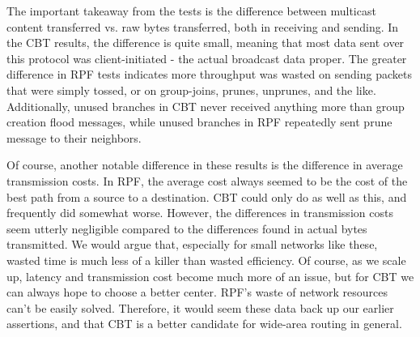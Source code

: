 \documentclass[11pt]{article}
\begin{document}
    The important takeaway from the tests is the difference between multicast content transferred vs. raw bytes transferred, both in receiving and sending. In the CBT results, the difference is quite small, meaning that most data sent over this protocol was client-initiated - the actual broadcast data proper. The greater difference in RPF tests indicates more throughput was wasted on sending packets that were simply tossed, or on group-joins, prunes, unprunes, and the like. Additionally, unused branches in CBT never received anything more than group creation flood messages, while unused branches in RPF repeatedly sent prune message to their neighbors.
    
    Of course, another notable difference in these results is the difference in average transmission costs. In RPF, the average cost always seemed to be the cost of the best path from a source to a destination. CBT could only do as well as this, and frequently did somewhat worse. However, the differences in transmission costs seem utterly negligible compared to the differences found in actual bytes transmitted. We would argue that, especially for small networks like these, wasted time is much less of a killer than wasted efficiency. Of course, as we scale up, latency and transmission cost become much more of an issue, but for CBT we can always hope to choose a better center. RPF's waste of network resources can't be easily solved. Therefore, it would seem these data back up our earlier assertions, and that CBT is a better candidate for wide-area routing in general.
\end{document}
